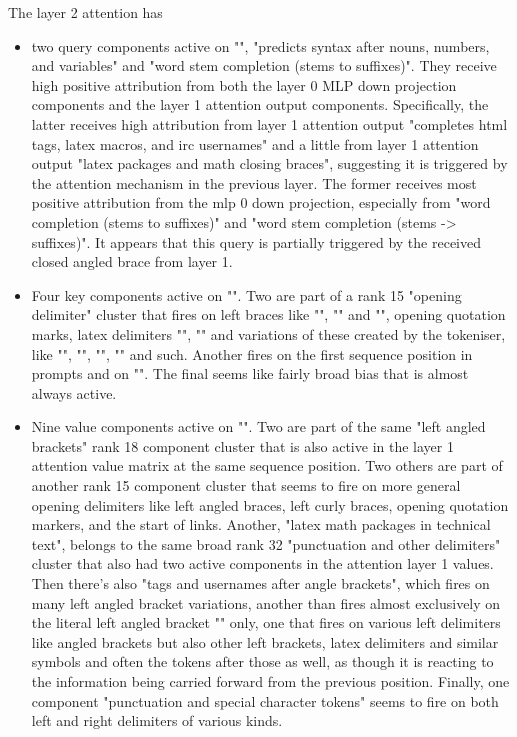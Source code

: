 \documentclass{article}
\begin{document}
The layer 2 attention has 
\begin{itemize}
    \item {two query components active on "", "predicts syntax after nouns, numbers, and variables" and "word stem completion (stems to suffixes)". They receive high positive attribution from both the layer 0 MLP down projection components and the layer 1 attention output components. Specifically, the latter receives high attribution from layer 1 attention output "completes html tags, latex macros, and irc usernames" and a little from layer 1 attention output "latex packages and math closing braces", suggesting it is triggered by the attention mechanism in the previous layer. The former receives most positive attribution from the mlp 0 down projection, especially from "word completion (stems to suffixes)" and "word stem completion (stems -> suffixes)". It appears that this query is partially triggered by the received closed angled brace from layer 1.}
    \item{Four key components active on "\code{<}". Two are part of a rank 15 "opening delimiter" cluster that fires on left braces like  "\code{<}", "\code{(}" and "\code{[}", opening quotation marks, latex delimiters "\code{\$}", "\code{**}" and variations of these created by the tokeniser, like "\code{[@}", "\code{(*}", "\code{\_\{}", "\code{![ }" and such. Another fires on the first sequence position in prompts and on "". The final seems like fairly broad bias that is almost always active. }
    \item{Nine value components active on "\code{<}". Two are part of the same "left angled brackets" rank 18 component cluster that is also active in the layer 1 attention value matrix at the same sequence position. Two others are part of another rank 15 component cluster that seems to fire on more general opening delimiters like left angled braces, left curly braces, opening quotation markers, and the start of links. Another, "latex math packages in technical text", belongs to the same broad rank 32 "punctuation and other delimiters" cluster that also had two active components in the attention layer 1 values. Then there's also "tags and usernames after angle brackets", which fires on many left angled bracket variations, another than fires almost exclusively on the literal left angled bracket "\code{<}" only, one that fires on various left delimiters like angled brackets but also other left brackets, latex delimiters and similar symbols and often the tokens after those as well, as though it is reacting to the information being carried forward from the previous position. Finally, one component "punctuation and special character tokens" seems to fire on both left and right delimiters of various kinds.}

\end{itemize}
\end{document}
